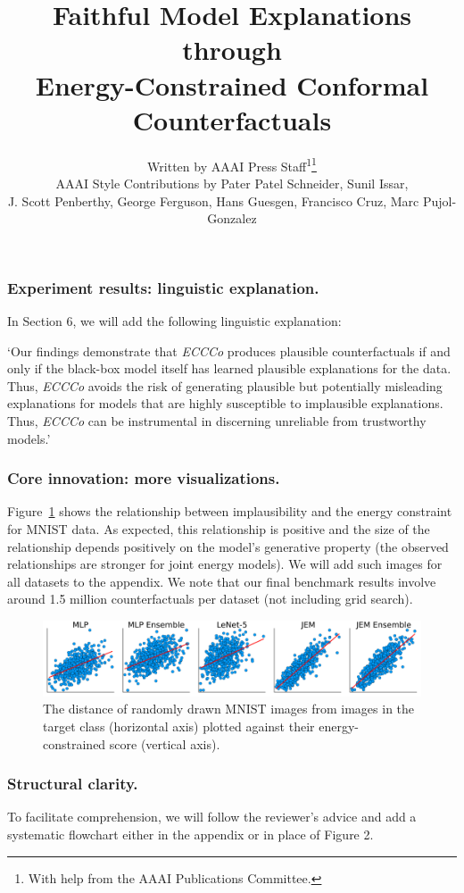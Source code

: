 \documentclass[letterpaper]{article} %
\title{Faithful Model Explanations through\\
Energy-Constrained Conformal Counterfactuals}
\author{
    Written by AAAI Press Staff\textsuperscript{\rm 1}\thanks{With help from the AAAI Publications Committee.}\\
    AAAI Style Contributions by Pater Patel Schneider,
    Sunil Issar,\\
    J. Scott Penberthy,
    George Ferguson,
    Hans Guesgen,
    Francisco Cruz\equalcontrib,
    Marc Pujol-Gonzalez\equalcontrib
}
\begin{document}
\subsubsection{Experiment results: linguistic explanation.} 

In Section 6, we will add the following linguistic explanation: 

`Our findings demonstrate that \textit{ECCCo} produces plausible counterfactuals if and only if the black-box model itself has learned plausible explanations for the data. Thus, \textit{ECCCo} avoids the risk of generating plausible but potentially misleading explanations for models that are highly susceptible to implausible explanations. Thus, \textit{ECCCo} can be instrumental in discerning unreliable from trustworthy models.'

\subsubsection{Core innovation: more visualizations.} 

Figure~\ref{fig:poc} shows the relationship between implausibility and the energy constraint for MNIST data. As expected, this relationship is positive and the size of the relationship depends positively on the model's generative property (the observed relationships are stronger for joint energy models). We will add such images for all datasets to the appendix. We note that our final benchmark results involve around 1.5 million counterfactuals per dataset (not including grid search).

\begin{figure}
    \centering
    \includegraphics[width=\linewidth]{../../www/dist_energy.png}
    \caption{The distance of randomly drawn MNIST images from images in the target class (horizontal axis) plotted against their energy-constrained score (vertical axis).}\label{fig:poc}
\end{figure}  

\subsubsection{Structural clarity.} 

To facilitate comprehension, we will follow the reviewer's advice and add a systematic flowchart either in the appendix or in place of Figure 2.
\end{document}
